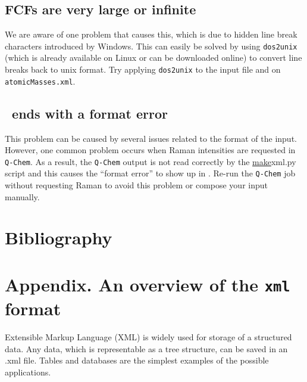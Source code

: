 \documentclass[11pt]{article}
\begin{document}
\subsection{FCFs are very large or infinite}
\label{sec:infinite}

We are aware of one problem that causes this, which is due to hidden line break characters introduced by Windows. 
This can easily be solved by using {\tt dos2unix} (which is already available on Linux or can be downloaded online) 
to convert line breaks back to unix format. Try applying {\tt dos2unix} to the input \xml file and on {\tt atomicMasses.xml}.


\subsection{\ezFCF\ ends with a format error}
\label{sec:formaterror}

This problem can be caused by several issues related to the format of the \xml input. However, one common problem 
occurs when Raman intensities are requested in {\tt Q-Chem}. As a result, the 
{\tt Q-Chem} output is not read correctly by the \ul{make}{xml.py} script and this causes the ``format error''
to show up in \ezFCF. Re-run the {\tt Q-Chem} job without requesting Raman to avoid this problem or
compose your \xml input manually.

\clearpage
\section*{Bibliography}



\clearpage
\section*{Appendix. An overview of the \texttt{xml} format}
\label{sec:xmlformat}

Extensible Markup Language (XML) is widely used for storage of a structured data. 
Any data, which is representable as a tree structure, can be saved in an .xml file. 
Tables and databases are the simplest examples of the possible applications. 
\end{document}
